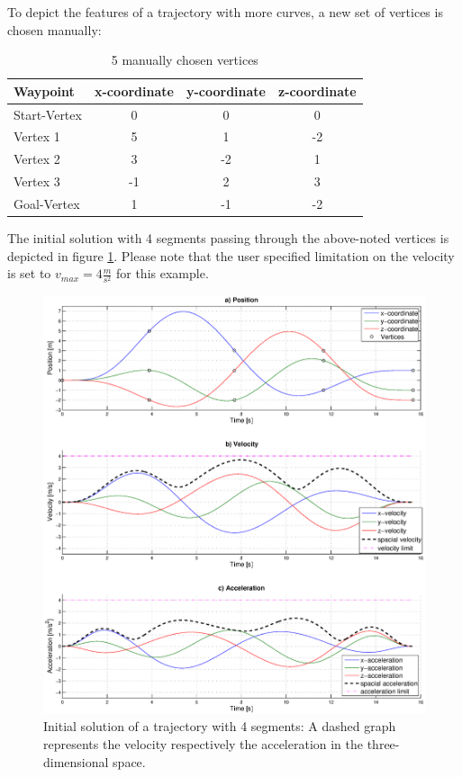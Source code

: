 To depict the features of a trajectory with more curves, a new set of vertices is chosen manually:

\begin{table}[H] 
\begin{center}
    \begin{tabular}{ | l | c | c | c |}
    \hline
    Waypoint & x-coordinate & y-coordinate & z-coordinate\\ \hline
    Start-Vertex & 0 & 0 & 0 \\ \hline
    Vertex 1 & 5 & 1 & -2\\ \hline
   Vertex 2 & 3 & -2 & 1\\ \hline
   Vertex 3 & -1 & 2 & 3\\ \hline
    Goal-Vertex & 1 & -1 & -2\\
    \hline
    \end{tabular}
\caption{5 manually chosen  vertices}
    \label{tab:5vertices}
\end{center}
\end{table}


The initial solution with 4 segments passing through the above-noted vertices is depicted in figure \ref{pic:optimizedSolution4init}. Please note that the user specified limitation on the velocity is set to $v_{max} = 4 \frac{m}{s^2}$ for this example.


\begin{figure}[H]
   \centering
   \includegraphics[trim = 33mm 30mm 30mm 15mm,clip,width=1\textwidth]{pics/4SegInit15s67.eps}
   \caption{Initial solution of a trajectory with 4 segments: A dashed graph represents the velocity respectively the acceleration in the three-dimensional space.}
   \label{pic:optimizedSolution4init}
\end{figure}
\newpage

